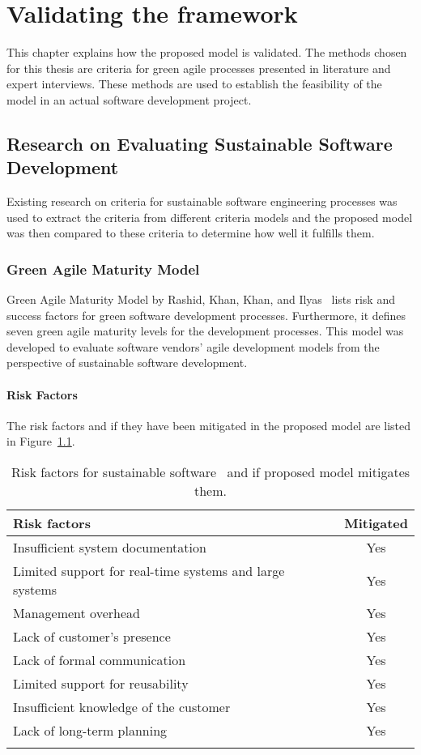 \chapter{Validating the framework}\label{chapter6}
This chapter explains how the proposed model is validated. The methods chosen for this thesis are criteria for green agile processes presented in literature and expert interviews. These methods are used to establish the feasibility of the model in an actual software development project.

\section{Research on Evaluating Sustainable Software Development}\label{criteriaeval}
Existing research on criteria for sustainable software engineering processes was used to extract the criteria from different criteria models and the proposed model was then compared to these criteria to determine how well it fulfills them.

\subsection{Green Agile Maturity Model}
Green Agile Maturity Model by Rashid, Khan, Khan, and Ilyas~\cite{greenagilematurity} lists risk and success factors for green software development processes.  Furthermore, it defines seven green agile maturity levels for the development processes. This model was developed to evaluate software vendors' agile development models from the perspective of sustainable software development.

\subsubsection{Risk Factors}
The risk factors and if they have been mitigated in the proposed model are listed in Figure~\ref{riskfactors}.

\begin{longtable}{ |l|c| }
\hline
\textbf{Risk factors} & \textbf{Mitigated}\\
\hline
Insufficient system documentation & Yes\\
\hline
Limited support for real-time systems and large systems & Yes \\
\hline
Management overhead & Yes\\
\hline
Lack of customer's presence & Yes\\
\hline
Lack of formal communication & Yes\\
\hline
Limited support for reusability & Yes\\
\hline
Insufficient knowledge of the customer & Yes\\
\hline
Lack of long-term planning & Yes\\
\hline
\caption{Risk factors for sustainable software~\cite{greenagilematurity} and if proposed model mitigates them.}
\label{riskfactors}
\end{longtable}


